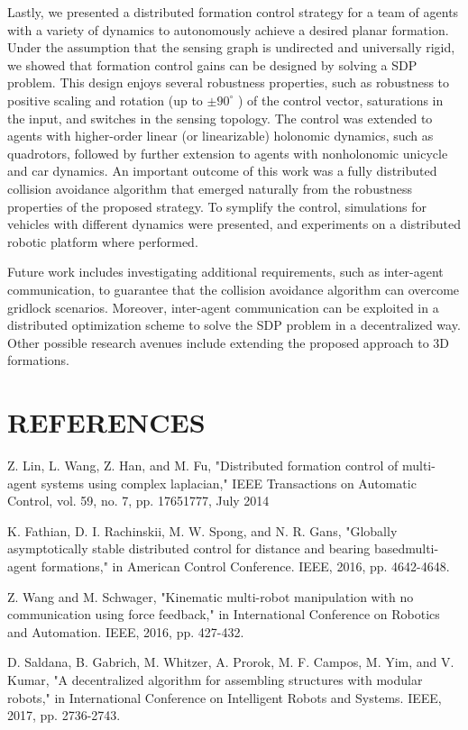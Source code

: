 \documentclass[10pt]{article}
\begin{document}
Lastly, we presented a distributed formation control strategy for a team of agents with a variety of dynamics to autonomously achieve a desired planar formation. Under the assumption that the sensing graph is undirected and universally rigid, we showed that formation control gains can be designed by solving a SDP problem. This design enjoys several robustness properties, such as robustness to positive scaling and rotation (up to $\pm 90^{\circ}$ ) of the control vector, saturations in the input, and switches in the sensing topology. The control was extended to agents with higher-order linear (or linearizable) holonomic dynamics, such as quadrotors, followed by further extension to agents with nonholonomic unicycle and car dynamics. An important outcome of this work was a fully distributed collision avoidance algorithm that emerged naturally from the robustness properties of the proposed strategy. To symplify the control, simulations for vehicles with different dynamics were presented, and experiments on a distributed robotic platform where performed.

Future work includes investigating additional requirements, such as inter-agent communication, to guarantee that the collision avoidance algorithm can overcome gridlock scenarios. Moreover, inter-agent communication can be exploited in a distributed optimization scheme to solve the SDP problem in a decentralized way. Other possible research avenues include extending the proposed approach to 3D formations.

\section{REFERENCES}
Z. Lin, L. Wang, Z. Han, and M. Fu, "Distributed formation control of multi-agent systems using complex laplacian," IEEE Transactions on Automatic Control, vol. 59, no. 7, pp. 17651777, July 2014

K. Fathian, D. I. Rachinskii, M. W. Spong, and N. R. Gans, "Globally asymptotically stable distributed control for distance and bearing basedmulti-agent formations," in American Control Conference. IEEE, 2016, pp. 4642-4648.

Z. Wang and M. Schwager, "Kinematic multi-robot manipulation with no communication using force feedback," in International Conference on Robotics and Automation. IEEE, 2016, pp. 427-432.

D. Saldana, B. Gabrich, M. Whitzer, A. Prorok, M. F. Campos, M. Yim, and V. Kumar, "A decentralized algorithm for assembling structures with modular robots," in International Conference on Intelligent Robots and Systems. IEEE, 2017, pp. 2736-2743.
\end{document}
